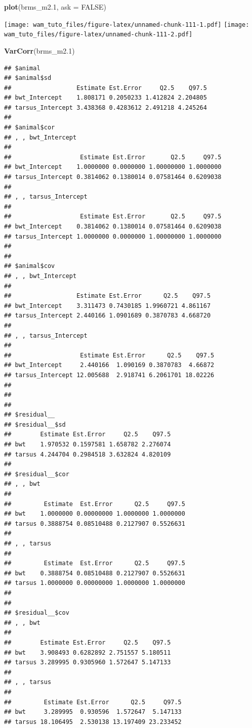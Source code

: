 \documentclass[
  12pt,
]{book}
\newenvironment{Shaded}{\begin{snugshade}}{\end{snugshade}}
\newcommand{\DataTypeTok}[1]{\textcolor[rgb]{0.13,0.29,0.53}{#1}}
\newcommand{\FloatTok}[1]{\textcolor[rgb]{0.00,0.00,0.81}{#1}}
\newcommand{\KeywordTok}[1]{\textcolor[rgb]{0.13,0.29,0.53}{\textbf{#1}}}
\newcommand{\NormalTok}[1]{#1}
\newcommand{\OtherTok}[1]{\textcolor[rgb]{0.56,0.35,0.01}{#1}}
\begin{document}
\begin{Shaded}
\begin{Highlighting}[]
\KeywordTok{plot}\NormalTok{(brms\_m2}\FloatTok{.1}\NormalTok{, }\DataTypeTok{ask =} \OtherTok{FALSE}\NormalTok{)}
\end{Highlighting}
\end{Shaded}

\texttt{[image: wam\_tuto\_files/figure-latex/unnamed-chunk-111-1.pdf]} \texttt{[image: wam\_tuto\_files/figure-latex/unnamed-chunk-111-2.pdf]}

\begin{Shaded}
\begin{Highlighting}[]
\KeywordTok{VarCorr}\NormalTok{(brms\_m2}\FloatTok{.1}\NormalTok{)}
\end{Highlighting}
\end{Shaded}

\begin{verbatim}
## $animal
## $animal$sd
##                  Estimate Est.Error     Q2.5    Q97.5
## bwt_Intercept    1.808171 0.2050233 1.412824 2.204805
## tarsus_Intercept 3.438368 0.4283612 2.491218 4.245264
## 
## $animal$cor
## , , bwt_Intercept
## 
##                   Estimate Est.Error       Q2.5     Q97.5
## bwt_Intercept    1.0000000 0.0000000 1.00000000 1.0000000
## tarsus_Intercept 0.3814062 0.1380014 0.07581464 0.6209038
## 
## , , tarsus_Intercept
## 
##                   Estimate Est.Error       Q2.5     Q97.5
## bwt_Intercept    0.3814062 0.1380014 0.07581464 0.6209038
## tarsus_Intercept 1.0000000 0.0000000 1.00000000 1.0000000
## 
## 
## $animal$cov
## , , bwt_Intercept
## 
##                  Estimate Est.Error      Q2.5    Q97.5
## bwt_Intercept    3.311473 0.7430185 1.9960721 4.861167
## tarsus_Intercept 2.440166 1.0901689 0.3870783 4.668720
## 
## , , tarsus_Intercept
## 
##                   Estimate Est.Error      Q2.5    Q97.5
## bwt_Intercept     2.440166  1.090169 0.3870783  4.66872
## tarsus_Intercept 12.005688  2.918741 6.2061701 18.02226
## 
## 
## 
## $residual__
## $residual__$sd
##        Estimate Est.Error     Q2.5    Q97.5
## bwt    1.970532 0.1597581 1.658782 2.276074
## tarsus 4.244704 0.2984518 3.632824 4.820109
## 
## $residual__$cor
## , , bwt
## 
##         Estimate  Est.Error      Q2.5     Q97.5
## bwt    1.0000000 0.00000000 1.0000000 1.0000000
## tarsus 0.3888754 0.08510488 0.2127907 0.5526631
## 
## , , tarsus
## 
##         Estimate  Est.Error      Q2.5     Q97.5
## bwt    0.3888754 0.08510488 0.2127907 0.5526631
## tarsus 1.0000000 0.00000000 1.0000000 1.0000000
## 
## 
## $residual__$cov
## , , bwt
## 
##        Estimate Est.Error     Q2.5    Q97.5
## bwt    3.908493 0.6282892 2.751557 5.180511
## tarsus 3.289995 0.9305960 1.572647 5.147133
## 
## , , tarsus
## 
##         Estimate Est.Error      Q2.5     Q97.5
## bwt     3.289995  0.930596  1.572647  5.147133
## tarsus 18.106495  2.530138 13.197409 23.233452
\end{verbatim}
\end{document}
